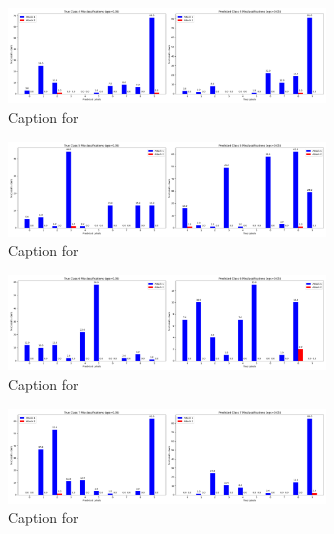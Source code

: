\documentclass{article}
\begin{document}
\begin{figure}[!htbp]
\centering
\includegraphics[width=0.75\textwidth]{combined_class_boundary_pgd/combined_class_4_misclassifications_eps_0.05.png}
\caption{Caption for }
\label{fig:combined_class_4_misclassifications_eps_0.05.png}
\end{figure}

\begin{figure}[!htbp]
\centering
\includegraphics[width=0.75\textwidth]{combined_class_boundary_pgd/combined_class_5_misclassifications_eps_0.05.png}
\caption{Caption for }
\label{fig:combined_class_5_misclassifications_eps_0.05.png}
\end{figure}

\begin{figure}[!htbp]
\centering
\includegraphics[width=0.75\textwidth]{combined_class_boundary_pgd/combined_class_6_misclassifications_eps_0.05.png}
\caption{Caption for }
\label{fig:combined_class_6_misclassifications_eps_0.05.png}
\end{figure}

\begin{figure}[!htbp]
\centering
\includegraphics[width=0.75\textwidth]{combined_class_boundary_pgd/combined_class_7_misclassifications_eps_0.05.png}
\caption{Caption for }
\label{fig:combined_class_7_misclassifications_eps_0.05.png}
\end{figure}
\end{document}
